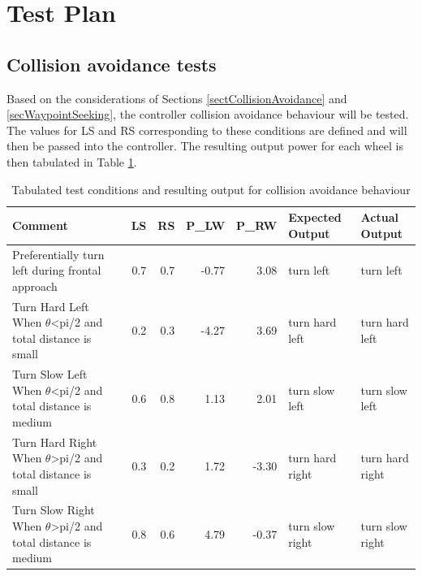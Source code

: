 \documentclass[11pt]{article}
\numberwithin{equation}{section}
\begin{document}
\section{Test Plan}
\label{sec:org54d9795}
\subsection{Collision avoidance tests}
\label{sec:org137e7a9}
Based on the considerations of Sections \ref{sectCollisionAvoidance} and \ref{secWaypointSeeking}, the controller collision avoidance behaviour will be tested. The values for LS and RS corresponding to these conditions are defined and will then be passed into the controller. The resulting output power for each wheel is then tabulated in Table \ref{tabColisAvoidanceTests}.

\begin{table}[H]
\caption{\label{tabColisAvoidanceTests}Tabulated test conditions and resulting output for collision avoidance behaviour}
\centering
\tiny
\begin{tabular}{lrrrrll}
\toprule
Comment \footnotemark & LS & RS & P\_LW & P\_RW & Expected Output & Actual Output\\
\midrule
Preferentially turn left during frontal approach & 0.7 & 0.7 & -0.77 & 3.08 & turn left & turn left\\
Turn Hard Left When \(\theta\)<pi/2 and total distance is small & 0.2 & 0.3 & -4.27 & 3.69 & turn hard left & turn hard left\\
Turn Slow Left When \(\theta\)<pi/2 and total distance is medium & 0.6 & 0.8 & 1.13 & 2.01 & turn slow left & turn slow left\\
Turn Hard Right When \(\theta\)>pi/2 and total distance is small & 0.3 & 0.2 & 1.72 & -3.30 & turn hard right & turn hard right\\
Turn Slow Right When \(\theta\)>pi/2 and total distance is medium & 0.8 & 0.6 & 4.79 & -0.37 & turn slow right & turn slow right\\
\bottomrule
\end{tabular}
\end{table}
\end{document}
